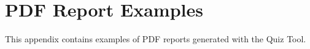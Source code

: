 \chapter{PDF Report Examples}
\label{chap:pdfreports}

This appendix contains examples of PDF reports generated with the Quiz Tool.


